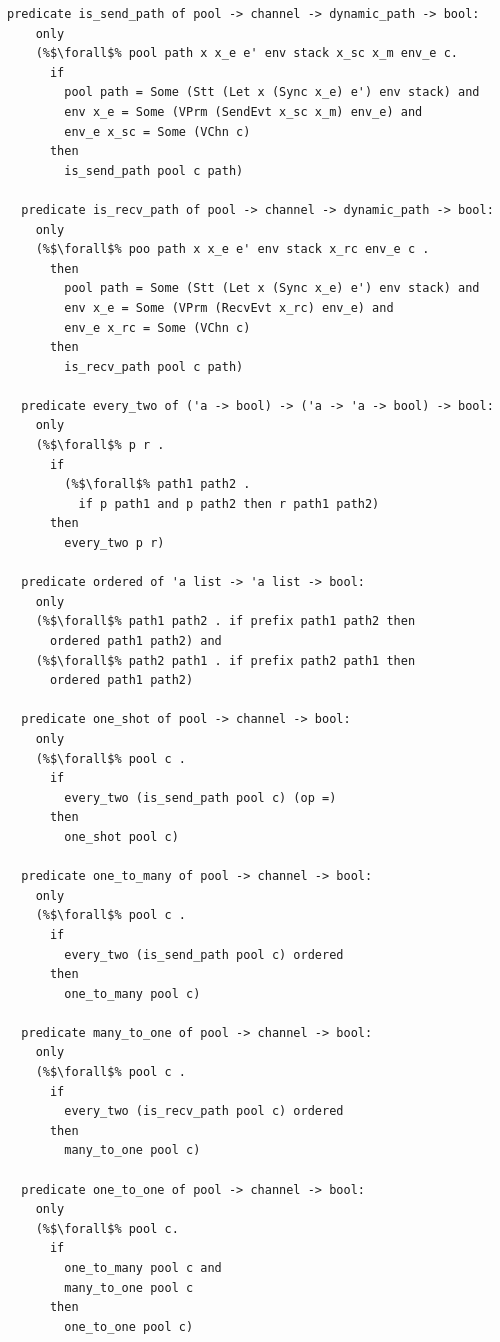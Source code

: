 \documentclass{article}
\begin{document}
\begin{lstlisting}[language=logic, escapechar=\%]
  predicate is_send_path of pool -> channel -> dynamic_path -> bool:
    only
    (%$\forall$% pool path x x_e e' env stack x_sc x_m env_e c.
      if
        pool path = Some (Stt (Let x (Sync x_e) e') env stack) and
        env x_e = Some (VPrm (SendEvt x_sc x_m) env_e) and 
        env_e x_sc = Some (VChn c)
      then
        is_send_path pool c path)

  predicate is_recv_path of pool -> channel -> dynamic_path -> bool:
    only
    (%$\forall$% poo path x x_e e' env stack x_rc env_e c .
      then
        pool path = Some (Stt (Let x (Sync x_e) e') env stack) and
        env x_e = Some (VPrm (RecvEvt x_rc) env_e) and
        env_e x_rc = Some (VChn c)
      then
        is_recv_path pool c path)

  predicate every_two of ('a -> bool) -> ('a -> 'a -> bool) -> bool:
    only
    (%$\forall$% p r .
      if
        (%$\forall$% path1 path2 .
          if p path1 and p path2 then r path1 path2)
      then
        every_two p r)

  predicate ordered of 'a list -> 'a list -> bool:
    only
    (%$\forall$% path1 path2 . if prefix path1 path2 then
      ordered path1 path2) and
    (%$\forall$% path2 path1 . if prefix path2 path1 then
      ordered path1 path2)

  predicate one_shot of pool -> channel -> bool:
    only
    (%$\forall$% pool c .
      if
        every_two (is_send_path pool c) (op =)
      then
        one_shot pool c)

  predicate one_to_many of pool -> channel -> bool:
    only
    (%$\forall$% pool c .
      if
        every_two (is_send_path pool c) ordered
      then
        one_to_many pool c)

  predicate many_to_one of pool -> channel -> bool:
    only
    (%$\forall$% pool c .
      if
        every_two (is_recv_path pool c) ordered
      then
        many_to_one pool c)

  predicate one_to_one of pool -> channel -> bool:
    only
    (%$\forall$% pool c.
      if
        one_to_many pool c and 
        many_to_one pool c
      then
        one_to_one pool c)
  \end{lstlisting}
\end{document}
